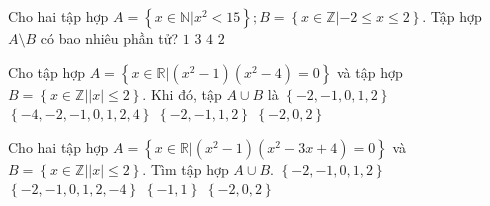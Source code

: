 \begin{ex}%
	Cho hai tập hợp $A=\left\{ x\in \mathbb{N} |  x^2<15 \right\}; B=\left\{
	x \in  \mathbb{Z} | -2 \le x \le 2 \right\}$. Tập hợp $A \setminus B$ có bao nhiêu phần tử?
	 \choice
		 {\True $1$}
		{$3$} 
		{$4$} 
		 {$2$}
\end{ex}

\begin{ex}%
	Cho tập  hợp $A =\left\{x \in \mathbb{R} \big| (x^2 -1)(x^2 - 4) = 0\right\}$ và tập hợp $B = \left\{x \in \mathbb{Z} \big| |x| \leq 2 \right\}$. Khi đó, tập $A \cup B$ là
	\choice 
		{\True $\left\{-2, -1, 0,  1, 2\right\}$}
		{$\left\{-4, -2, -1, 0, 1,  2, 4\right\}$}
		{$\left\{-2,  -1, 1, 2\right\}$}
		{$\left\{-2, 0,  2\right\}$}
\end{ex}

\begin{ex}%
	Cho hai tập hợp $A=\left\{x\in \mathbb{R}\big|\left(x^2-1 \right)\left(x^2-3x+4  \right)=0 \right\}$ và $B=\left\{x\in \mathbb{Z}\big|\left| x \right|\leq 2 \right\}$. Tìm tập hợp $A\cup B$.
	\choice 
		 {\True $\left\{-2,-1,0,1,2 \right\}$}
		{$\left\{-2,-1,0,1,2, -4  \right\}$}
		{$\left\{-1, 1  \right\}$}
		{$\left\{-2, 0,  2\right\}$}
\end{ex}
